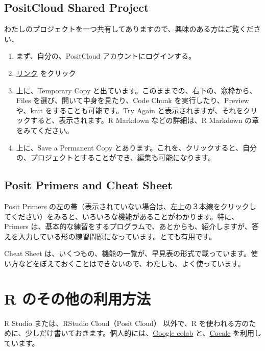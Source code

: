 \documentclass[
  xelatex, ja=standard]{bxjsbook}
\providecommand{\tightlist}{%
  \setlength{\itemsep}{0pt}\setlength{\parskip}{0pt}}
\theoremstyle{definition}
\theoremstyle{definition}
\theoremstyle{definition}
\theoremstyle{definition}
\theoremstyle{remark}
\begin{document}
\hypertarget{positcloud-shared-project}{%
\subsection{PositCloud Shared Project}\label{positcloud-shared-project}}

わたしのプロジェクトを一つ共有してありますので、興味のある方はご覧ください、

\begin{enumerate}
\def\labelenumi{\arabic{enumi}.}
\tightlist
\item
  まず、自分の、PositCloud アカウントにログインする。
\item
  \href{https://posit.cloud/content/5539763}{リンク} をクリック
\item
  上に、Temporary Copy と出ています。このままでの、右下の、窓枠から、Files を選び、開いて中身を見たり、Code Chunk を実行したり、Preview や、knit をすることも可能です。Try Again と表示されますが、それをクリックすると、表示されます。R Markdown などの詳細は、R Markdown の章をみてください。
\item
  上に、Save a Permanent Copy とあります。これを、クリックすると、自分の、プロジェクトとすることができ、編集も可能になります。
\end{enumerate}

\hypertarget{posit-primers-and-cheat-sheet}{%
\subsection{Posit Primers and Cheat Sheet}\label{posit-primers-and-cheat-sheet}}

Posit Primers の左の帯（表示されていない場合は、左上の３本線をクリックしてください）をみると、いろいろな機能があることがわかります。特に、Primers は、基本的な練習をするプログラムで、あとからも、紹介しますが、答えを入力している形の練習問題になっています。とても有用です。

Cheat Sheet は、いくつもの、機能の一覧が、早見表の形式で載っています。使い方などをぼえておくことはできないので、わたしも、よく使っています。

\hypertarget{r-ux306eux305dux306eux4ed6ux306eux5229ux7528ux65b9ux6cd5}{%
\section{R のその他の利用方法}\label{r-ux306eux305dux306eux4ed6ux306eux5229ux7528ux65b9ux6cd5}}

R Studio または、RStudio Cloud（Posit Cloud） 以外で、R を使われる方のために、少しだけ書いておきます。個人的には、\href{https://colab.research.google.com}{Google colab} と、\href{https://cocalc.com}{Cocalc} を利用しています。
\end{document}
